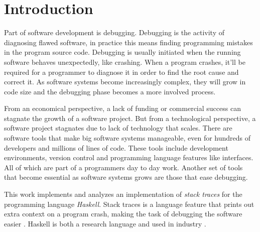 \chapter{Introduction}

Part of software development is debugging. Debugging is the activity of
diagnosing flawed software, in practice this means finding programming mistakes
in the program source code. Debugging is usually initiated when the running
software behaves unexpectedly, like crashing. When a program crashes, it'll be
required for a programmer to diagnose it in order to find the root cause and
correct it. As software systems become increasingly complex, they will grow in
code size and the debugging phase becomes a more involved process.

From an economical perspective, a lack of funding or commercial success can
stagnate the growth of a software project. But from a technological perspective, a
software project stagnates due to lack of technology that scales. There are
software tools that make big software systems manageable, even for
hundreds of developers and millions of lines of code. These tools include
development environments, version control and programming language features
like interfaces. All of which are part of a programmers day to day work.
Another set of tools that become essential as software systems grows are those
that ease debugging.

This work implements and analyzes an implementation of \emph{stack traces} for
the programming language \emph{Haskell}. Stack traces is a language feature
that prints out extra context on a program crash, making the task of debugging
the software easier \cite{schroter2010stack}. Haskell is both a research language
\cite{haskell_org_research_papers, dagit_getting_started_with_ghc_hacking}
and used in industry \cite{haskell_in_industry, fpcomplete_case_studies}.
